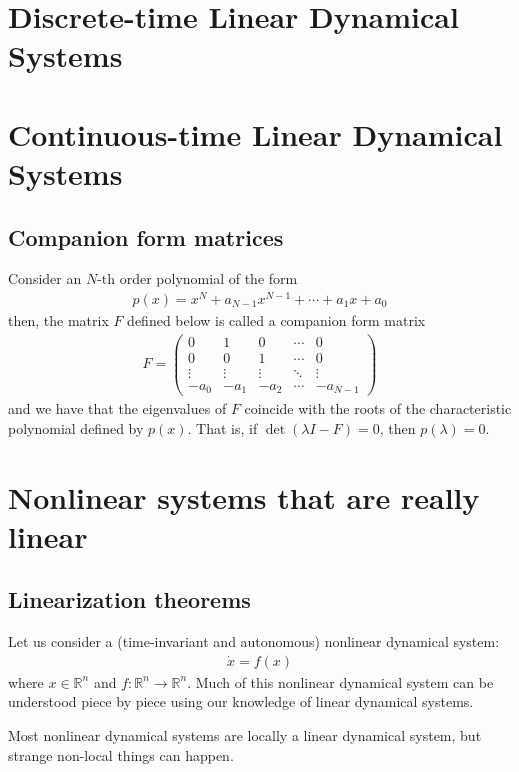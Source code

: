 \documentclass[a4paper,11pt]{exam}
\newcounter{ct}
\newcommand{\field}[1]{\ensuremath{\mathbb{#1}}}
\newcommand{\reals}{\field{R}}
\begin{document}
\section{Discrete-time Linear Dynamical Systems}

\section{Continuous-time Linear Dynamical Systems}
\subsection{Companion form matrices}
Consider an $N\text{-th}$ order polynomial of the form
\begin{align}
    p(x) = x^N + a_{N-1} x^{N-1} + \cdots + a_1 x + a_0
\end{align}
then, the matrix $F$ defined below is called a companion form matrix
\begin{align}
    F = \begin{pmatrix} 0 & 1 & 0 & \cdots & 0\\
                        0 & 0 & 1 & \cdots & 0\\
                        \vdots & \vdots & \vdots & \ddots & \vdots\\
                        -a_0 & -a_1 & -a_2 & \cdots & -a_{N-1}\end{pmatrix}
\end{align}
and we have that the eigenvalues of $F$ coincide with the roots of the characteristic polynomial defined by $p(x)$.  That is, if $\det(\lambda I - F) = 0$, then $p(\lambda) = 0$.  

\section{Nonlinear systems that are really linear}
\subsection{Linearization theorems}
Let us consider a (time-invariant and autonomous) nonlinear dynamical system:
\begin{align}
    \dot{x} = f(x)
\end{align}
where $x \in \reals^n$ and $f: \reals^n \to \reals^n$.
Much of this nonlinear dynamical system can be understood piece by piece using our knowledge of linear dynamical systems.

\begin{tcolorbox}[colback=black!1!,title=Linearize that beast!]
    Most nonlinear dynamical systems are locally a linear dynamical system, but strange non-local things can happen.
\end{tcolorbox}
\end{document}

